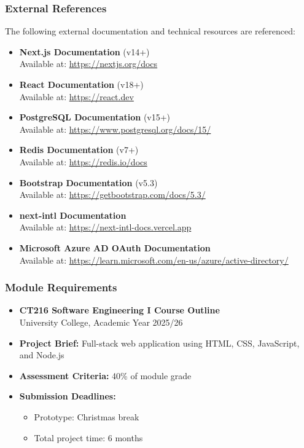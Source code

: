 \documentclass[12pt,a4paper]{article}
\begin{document}
\subsubsection{External References}

The following external documentation and technical resources are referenced:

\begin{itemize}
    \item \textbf{Next.js Documentation} (v14+) \\
    Available at: \url{https://nextjs.org/docs}

    \item \textbf{React Documentation} (v18+) \\
    Available at: \url{https://react.dev}

    \item \textbf{PostgreSQL Documentation} (v15+) \\
    Available at: \url{https://www.postgresql.org/docs/15/}

    \item \textbf{Redis Documentation} (v7+) \\
    Available at: \url{https://redis.io/docs}

    \item \textbf{Bootstrap Documentation} (v5.3) \\
    Available at: \url{https://getbootstrap.com/docs/5.3/}

    \item \textbf{next-intl Documentation} \\
    Available at: \url{https://next-intl-docs.vercel.app}

    \item \textbf{Microsoft Azure AD OAuth Documentation} \\
    Available at: \url{https://learn.microsoft.com/en-us/azure/active-directory/}
\end{itemize}

\subsubsection{Module Requirements}

\begin{itemize}
    \item \textbf{CT216 Software Engineering I Course Outline} \\
    University College, Academic Year 2025/26

    \item \textbf{Project Brief:} Full-stack web application using HTML, CSS, JavaScript, and Node.js

    \item \textbf{Assessment Criteria:} 40\% of module grade

    \item \textbf{Submission Deadlines:}
    \begin{itemize}
        \item Prototype: Christmas break
        \item Total project time: 6 months
    \end{itemize}
\end{itemize}
\end{document}
